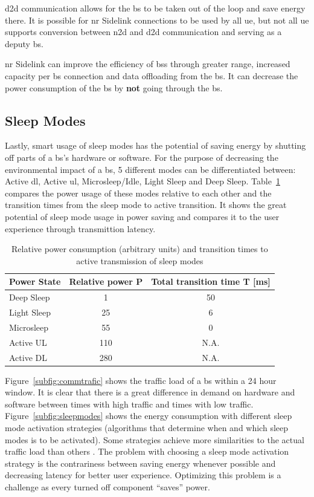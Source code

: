 \documentclass[11pt,a4paper]{article}
\begin{document}
\acrlong{d2d} communication allows for the \acrshort{bs} to be taken out of the loop and save energy there.
It is possible for \acrshort{nr} Sidelink connections to be used by all \acrlong{ue}, but not all \acrshort{ue} supports conversion between \acrshort{n2d} and \acrshort{d2d} communication and serving as a deputy \acrshort{bs}.

\acrshort{nr} Sidelink can improve the efficiency of \acrlong{bs}s through greater range, increased capacity per \acrshort{bs} connection and data offloading from the \acrshort{bs}.
It can decrease the power consumption of the \acrshort{bs} by \textbf{not} going through the \acrshort{bs}.

\subsection{Sleep Modes}\label{subsec:sleep}
Lastly, smart usage of sleep modes has the potential of saving energy by shutting off parts of a \acrshort{bs}'s hardware or software.
For the purpose of decreasing the environmental impact of a \acrshort{bs}, 5 different modes can be differentiated between: Active \acrshort{dl}, Active \acrshort{ul}, Microsleep/Idle, Light Sleep and Deep Sleep.
Table~\ref{tab:sleeppower} compares the power usage of these modes relative to each other and the transition times from the sleep mode to active transition.
It shows the great potential of sleep mode usage in power saving and compares it to the user experience through transmittion latency.

\begin{table}[t]
  \begin{tabular}{lcc}
    Power State     & Relative power P & Total transition time T [ms] \\
    \hline
    Deep Sleep      & 1   & 50   \\
    Light Sleep     & 25  & 6    \\
    Microsleep      & 55  & 0    \\
    Active UL       & 110 & N.A. \\
    Active DL       & 280 & N.A. \\
  \end{tabular}
  \caption{Relative power consumption (arbitrary units) and transition times to active transmission of sleep modes \citep{energymodeling}}\label{tab:sleeppower}
\end{table}

Figure~\ref{subfig:commtrafic} shows the traffic load of a \acrshort{bs} within a 24 hour window.
It is clear that there is a great difference in demand on hardware and software between times with high traffic and times with low traffic.
Figure~\ref{subfig:sleepmodes} shows the energy consumption with different sleep mode activation strategies (algorithms that determine when and which sleep modes is to be activated).
Some strategies achieve more similarities to the actual traffic load than others \citep{DynamicSleepModeControl}.
The problem with choosing a sleep mode activation strategy is the contrariness between saving energy whenever possible and decreasing latency for better user experience.
Optimizing this problem is a challenge as every turned off component \enquote{saves} power.
\end{document}
